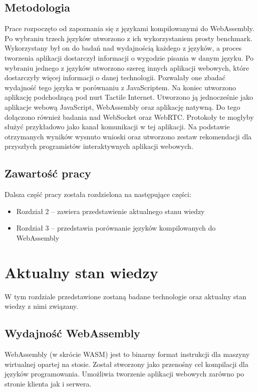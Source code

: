 \documentclass[language=polish,type=master]{aghmodern}
\begin{document}
\section{Metodologia}
Prace rozpoczęto od zapoznania się z językami kompilowanymi do WebAssembly.
Po wybraniu trzech języków utworzono z ich wykorzystaniem prosty benchmark.
Wykorzystany był on do badań nad wydajnością każdego z języków, a proces tworzenia aplikacji dostarczył informacji o wygodzie pisania w danym języku.
Po wybraniu jednego z języków utworzono szereg innych aplikacji webowych, które dostarczyły więcej informacji o danej technologii.
Pozwalały one zbadać wydajność tego języka w porównaniu z JavaScriptem.
Na koniec utworzono aplikację podchodzącą pod nurt Tactile Internet.
Utworzono ją jednocześnie jako aplikacje webową JavaScript, WebAssembly oraz aplikację natywną.
Do tego dołączono również badania nad WebSocket oraz WebRTC.
Protokoły te mogłyby służyć przykładowo jako kanał komunikacji w tej aplikacji.
Na podstawie otrzymanych wyników wysnuto wnioski oraz utworzono zestaw rekomendacji dla przyszłych programistów interaktywnych aplikacji webowych.


\section{Zawartość pracy}
Dalsza część pracy została rozdzielona na następujące części:

\begin{itemize}
    \item Rozdział 2 -- zawiera przedstawienie aktualnego stanu wiedzy
    \item Rozdział 3 -- przedstawia porównanie języków kompilowanych do WebAssembly
\end{itemize}

\chapter{Aktualny stan wiedzy}
W tym rozdziale przedstawione zostaną badane technologie oraz aktualny stan wiedzy z nimi związany.

\section{Wydajność WebAssembly}
WebAssembly (w skrócie WASM) jest to binarny format instrukcji dla maszyny wirtualnej opartej na stosie.
Został stworzony jako przenośny cel kompilacji dla języków programowania.
Umożliwia tworzenie aplikacji webowych zarówno po stronie klienta jak i serwera.
\end{document}
